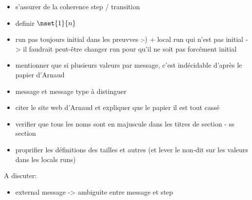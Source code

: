 \begin{itemize}
	\item s'assurer de la coherence step / transition
    \item definir $\nset{1}{n}$
    \item run pas toujours initial dans les preuvves :-) + local run qui n'est pas initial -> il faudrait peut-être changer run pour qu'il ne soit pas forcément initial
    \item mentionner que si plusieurs valeurs par message, c'est indécidable d'après le papier d'Arnaud
    \item message et message type à distinguer 
    \item citer le site web d'Arnaud et expliquer que le papier il est tout cassé
    \item verifier que tous les noms sont en majuscule dans les titres de section - ss section
    \item proprifier les définitions des tailles et autres (et lever le non-dit sur les valeurs dans les locals runs)
\end{itemize}

A discuter:
\begin{itemize}
\item external message -> ambiguite entre message et step 
\end{itemize}